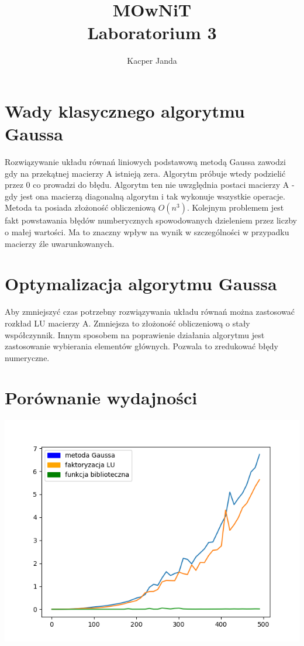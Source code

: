 \documentclass[11pt, a4paper]{article}
\begin{document}
\title{MOwNiT\\Laboratorium 3}
\author{Kacper Janda}
\date{}
\maketitle

\section{Wady klasycznego algorytmu Gaussa}
Rozwiązywanie układu równań liniowych podstawową metodą Gaussa zawodzi gdy na przekątnej macierzy A istnieją zera. Algorytm próbuje wtedy podzielić przez \begin{math} 0 \end{math} co prowadzi do błędu. Algorytm ten nie uwzględnia postaci macierzy A - gdy jest ona macierzą diagonalną algorytm i tak wykonuje wszystkie operacje. Metoda ta posiada złożoność obliczeniową \begin{math} O(n^3) \end{math}. Kolejnym problemem jest fakt powstawania błędów numberycznych spowodowanych dzieleniem przez liczby o małej wartości. Ma to znaczny wpływ na wynik w szczególności w przypadku macierzy źle uwarunkowanych.\\

\section{Optymalizacja algorytmu Gaussa}
Aby zmniejszyć czas potrzebny rozwiązywania układu równań można zastosować rozkład LU macierzy A. Zmniejsza to złożoność obliczeniową o stały współczynnik. Innym sposobem na poprawienie działania algorytmu jest zastosowanie wybierania elementów głównych. Pozwala to zredukować błędy numeryczne.\\

\section{Porównanie wydajności}
\includegraphics[scale=0.8]{Figure_1}
\end{document}

